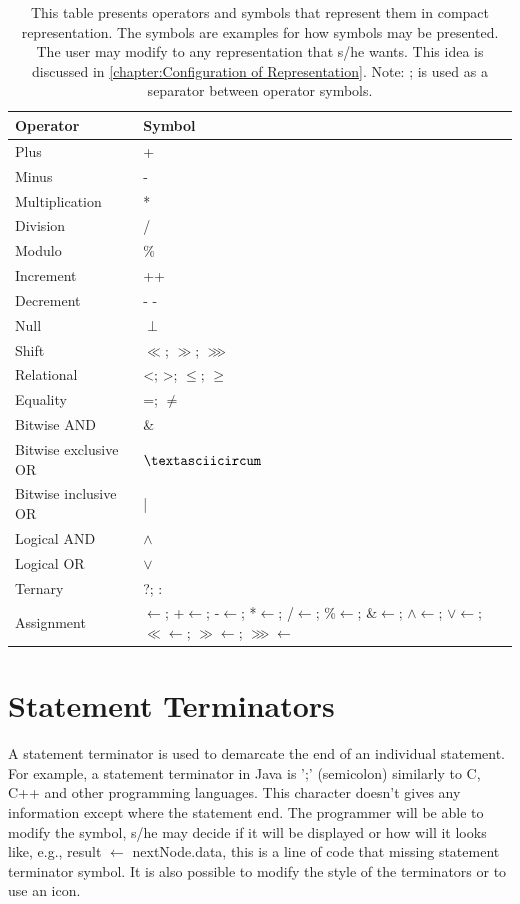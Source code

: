 \begin{table}[H]
\centering
\begin{tabular}{|l|l|}
\hline
{\bf Operator} & {\bf Symbol} \\ \hline
Plus & + \\ \hline
Minus & - \\ \hline
Multiplication & * \\ \hline
Division & / \\ \hline
Modulo & \% \\ \hline
Increment & ++ \\ \hline
Decrement & - - \\ \hline
Null & $ \perp $ \\ \hline
Shift & $ \ll $; $ \gg $; $ \ggg $ \\ \hline
Relational & <; >; $ \leq $; $ \geq $ \\ \hline
Equality & =; $ \neq $ \\ \hline
Bitwise AND & \& \\ \hline
Bitwise exclusive OR & $ \textasciicircum $ \\ \hline
Bitwise inclusive OR & | \\ \hline
Logical AND & $ \wedge $  \\ \hline
Logical OR & $ \vee $  \\ \hline
Ternary & ?; : \\ \hline
Assignment & $ \longleftarrow $; +$ \longleftarrow $; -$ \longleftarrow $; *$ \longleftarrow $; /$ \longleftarrow $; \%$ \longleftarrow $; \&$ \longleftarrow $; $ \wedge $$ \longleftarrow $; $ \vee $$ \longleftarrow $; $ \ll $$ \longleftarrow $; $ \gg $$ \longleftarrow $; $ \ggg $$ \longleftarrow $\\ \hline
\end{tabular}
\caption{This table presents operators and symbols that represent them in compact representation. The symbols are examples for how symbols may be presented. The user may modify to any representation that s/he wants. This idea is discussed in \autoref{chapter:Configuration of Representation}. Note: ; is used as a separator between operator symbols.}
\label{tab12}
\end{table}
\section{Statement Terminators}
A statement terminator is used to demarcate the end of an individual statement. For example, a statement terminator in Java is ';' (semicolon) similarly to C, C++ and other programming languages. This character doesn't gives any information except where the statement end. The programmer will be able to modify the symbol, s/he may decide if it will be displayed or how will it looks like, e.g., result $ \longleftarrow $ nextNode.data, this is a line of code that missing statement terminator symbol. It is also possible to modify the style of the terminators or to use an icon.
